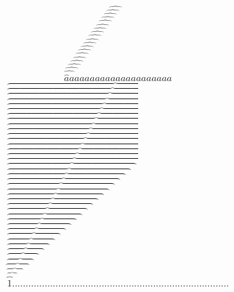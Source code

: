 \documentclass{article}
\begin{document}
\[
  \widehat{
  \widehat{
  \widehat{
  \widehat{
  \widehat{
  \widehat{
  \widehat{
  \widehat{
  \widehat{
  \widehat{
  \widehat{
  \widehat{
  \widehat{
  \widehat{
  \widehat{
  \widehat{
  \widehat{
  \widehat{
  \widehat{
  \widehat{
    a
  }a
  }a
  }a
  }a
  }a
  }a
  }a
  }a
  }a
  }a
  }a
  }a
  }a
  }a
  }a
  }a
  }a
  }a
  }a
  }a
\]
\[
  \overbrace{
  \overbrace{
  \overbrace{
  \overbrace{
  \overbrace{
  \overbrace{
  \overbrace{
  \overbrace{
  \overbrace{
  \overbrace{
  \overbrace{
  \overbrace{
  \overbrace{
  \overbrace{
  \overbrace{
  \overbrace{
  \overbrace{
  \overbrace{
  \overbrace{
  \overbrace{
  \overbrace{
  \overbrace{
  \overbrace{
  \overbrace{
  \overbrace{
  \overbrace{
  \overbrace{
  \overbrace{
  \overbrace{
  \overbrace{
  \overbrace{
  \overbrace{
  \overbrace{
  \overbrace{
  \overbrace{
  \overbrace{
  \overbrace{
  \overbrace{
  \overbrace{
  \overbrace{
    1
  }..
  }..
  }..
  }..
  }..
  }..
  }..
  }..
  }..
  }..
  }..
  }..
  }..
  }..
  }..
  }..
  }..
  }..
  }..
  }..
  }..
  }..
  }..
  }..
  }..
  }..
  }..
  }..
  }..
  }..
  }..
  }..
  }..
  }..
  }..
  }..
  }..
  }..
  }..
  }..
\]
\end{document}
